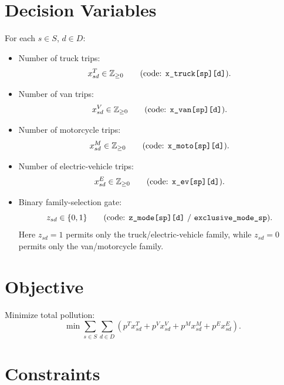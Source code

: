 \section*{Decision Variables}

For each \(s\in S\), \(d\in D\):

\begin{itemize}
    \item Number of truck trips:
    \[
    x^T_{sd}\in \mathbb{Z}_{\ge 0}
    \qquad \text{(code: \texttt{x\_truck[sp][d]})}.
    \]
    \item Number of van trips:
    \[
    x^V_{sd}\in \mathbb{Z}_{\ge 0}
    \qquad \text{(code: \texttt{x\_van[sp][d]})}.
    \]
    \item Number of motorcycle trips:
    \[
    x^M_{sd}\in \mathbb{Z}_{\ge 0}
    \qquad \text{(code: \texttt{x\_moto[sp][d]})}.
    \]
    \item Number of electric-vehicle trips:
    \[
    x^E_{sd}\in \mathbb{Z}_{\ge 0}
    \qquad \text{(code: \texttt{x\_ev[sp][d]})}.
    \]
    \item Binary family-selection gate:
    \[
    z_{sd}\in\{0,1\}
    \qquad \text{(code: \texttt{z\_mode[sp][d]} / \texttt{exclusive\_mode\_sp})}.
    \]
    Here \(z_{sd}=1\) permits only the truck/electric-vehicle family, while \(z_{sd}=0\) permits only the van/motorcycle family.
\end{itemize}

\section*{Objective}

Minimize total pollution:
\[
\min \sum_{s\in S}\sum_{d\in D}
\left(
p^T x^T_{sd}
+ p^V x^V_{sd}
+ p^M x^M_{sd}
+ p^E x^E_{sd}
\right).
\]

\section*{Constraints}

